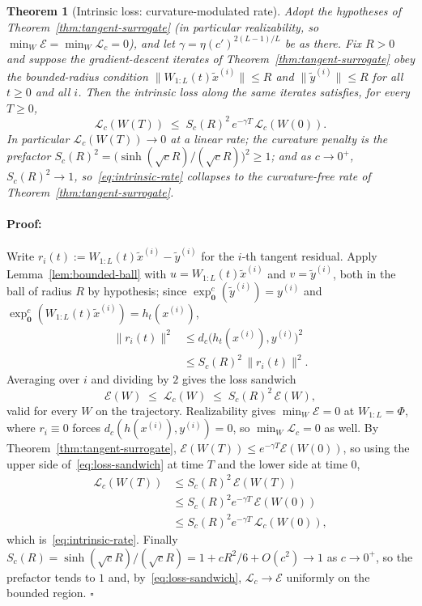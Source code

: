 \documentclass[letterpaper]{article}
\newenvironment{proof}[1][Proof]{\paragraph{#1:}}{\hfill$\square$}
\newcommand{\exps}{\exp_{\mathbf{0}}^c}
\newtheorem{theorem}{Theorem}
\begin{document}
\begin{theorem}[Intrinsic loss: curvature-modulated rate]
\label{thm:intrinsic-rate}
Adopt the hypotheses of Theorem~\ref{thm:tangent-surrogate} (in particular
realizability, so $\min_W\mathcal E=\min_W\mathcal L_c=0$), and let
$\gamma=\eta(c')^{2(L-1)/L}$ be as there. Fix $R>0$ and suppose the
gradient-descent iterates of Theorem~\ref{thm:tangent-surrogate} obey the
bounded-radius condition $\|W_{1:L}(t)\tilde x^{(i)}\|\le R$ and
$\|\tilde y^{(i)}\|\le R$ for all $t\ge0$ and all $i$. Then the intrinsic
loss along the same iterates satisfies, for every $T\ge0$,
\begin{equation}
\label{eq:intrinsic-rate}
\mathcal L_c(W(T))\;\le\;S_c(R)^2\,e^{-\gamma T}\,\mathcal L_c(W(0)).
\end{equation}
In particular $\mathcal L_c(W(T))\to0$ at a linear rate; the curvature penalty
is the prefactor $S_c(R)^2=\big(\sinh(\sqrt c R)/(\sqrt c R)\big)^2\ge1$; and
as $c\to0^+$, $S_c(R)^2\to1$, so~\eqref{eq:intrinsic-rate} collapses to the
curvature-free rate of Theorem~\ref{thm:tangent-surrogate}.
\end{theorem}

\begin{proof}
Write $r_i(t):=W_{1:L}(t)\tilde x^{(i)}-\tilde y^{(i)}$ for the $i$-th tangent
residual. Apply Lemma~\ref{lem:bounded-ball} with $u=W_{1:L}(t)\tilde x^{(i)}$
and $v=\tilde y^{(i)}$, both in the ball of radius $R$ by hypothesis; since
$\exps(\tilde y^{(i)})=y^{(i)}$ and
$\exps(W_{1:L}(t)\tilde x^{(i)})=h_t(x^{(i)})$,
\[
\begin{aligned}
\|r_i(t)\|^2
&\le d_c\big(h_t(x^{(i)}),y^{(i)}\big)^2\\
&\le S_c(R)^2\,\|r_i(t)\|^2 .
\end{aligned}
\]
Averaging over $i$ and dividing by $2$ gives the loss sandwich
\begin{equation}
\label{eq:loss-sandwich}
\mathcal E(W)\;\le\;\mathcal L_c(W)\;\le\;S_c(R)^2\,\mathcal E(W),
\end{equation}
valid for every $W$ on the trajectory. Realizability gives
$\min_W\mathcal E=0$ at $W_{1:L}=\Phi$, where $r_i\equiv0$ forces
$d_c(h(x^{(i)}),y^{(i)})=0$, so $\min_W\mathcal L_c=0$ as well. By
Theorem~\ref{thm:tangent-surrogate},
$\mathcal E(W(T))\le e^{-\gamma T}\mathcal E(W(0))$, so using the upper side
of~\eqref{eq:loss-sandwich} at time $T$ and the lower side at time $0$,
\[
\begin{aligned}
\mathcal L_c(W(T))
&\le S_c(R)^2\,\mathcal E(W(T))\\
&\le S_c(R)^2 e^{-\gamma T}\,\mathcal E(W(0))\\
&\le S_c(R)^2 e^{-\gamma T}\,\mathcal L_c(W(0)),
\end{aligned}
\]
which is~\eqref{eq:intrinsic-rate}. Finally
$S_c(R)=\sinh(\sqrt c R)/(\sqrt c R)=1+cR^2/6+O(c^2)\to1$ as $c\to0^+$, so the
prefactor tends to $1$ and, by~\eqref{eq:loss-sandwich},
$\mathcal L_c\to\mathcal E$ uniformly on the bounded region.
\end{proof}
\end{document}
